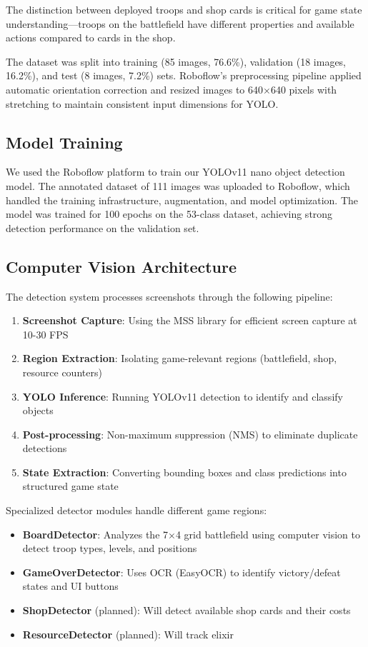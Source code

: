 \documentclass[12pt]{article}
\begin{document}
The distinction between deployed troops and shop cards is critical for game state understanding—troops on the battlefield have different properties and available actions compared to cards in the shop.

The dataset was split into training (85 images, 76.6\%), validation (18 images, 16.2\%), and test (8 images, 7.2\%) sets. Roboflow's preprocessing pipeline applied automatic orientation correction and resized images to 640×640 pixels with stretching to maintain consistent input dimensions for YOLO.

\subsection{Model Training}

We used the Roboflow platform to train our YOLOv11 nano object detection model. The annotated dataset of 111 images was uploaded to Roboflow, which handled the training infrastructure, augmentation, and model optimization. The model was trained for 100 epochs on the 53-class dataset, achieving strong detection performance on the validation set.

\subsection{Computer Vision Architecture}

The detection system processes screenshots through the following pipeline:

\begin{enumerate}
    \item \textbf{Screenshot Capture}: Using the MSS library for efficient screen capture at 10-30 FPS
    \item \textbf{Region Extraction}: Isolating game-relevant regions (battlefield, shop, resource counters)
    \item \textbf{YOLO Inference}: Running YOLOv11 detection to identify and classify objects
    \item \textbf{Post-processing}: Non-maximum suppression (NMS) to eliminate duplicate detections
    \item \textbf{State Extraction}: Converting bounding boxes and class predictions into structured game state
\end{enumerate}

Specialized detector modules handle different game regions:

\begin{itemize}
    \item \textbf{BoardDetector}: Analyzes the 7×4 grid battlefield using computer vision to detect troop types, levels, and positions
    \item \textbf{GameOverDetector}: Uses OCR (EasyOCR) to identify victory/defeat states and UI buttons
    \item \textbf{ShopDetector} (planned): Will detect available shop cards and their costs
    \item \textbf{ResourceDetector} (planned): Will track elixir
\end{itemize}
\end{document}

